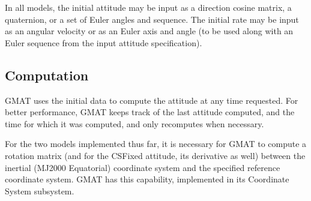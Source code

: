 In all models, the initial attitude may be input as a direction cosine matrix, a quaternion, or a set of Euler angles and sequence.  The initial rate may be input as an angular velocity or as an Euler axis and angle (to be used along with an Euler sequence from the input attitude specification).

\subsection{Computation}

GMAT uses the initial data to compute the attitude at any time requested.  For better performance, GMAT keeps track of the last attitude computed, and the time for which it was computed, and only recomputes when necessary.

For the two models implemented thus far, it is necessary for GMAT to compute a rotation matrix (and for the CSFixed attitude, its derivative as well) between the inertial (MJ2000 Equatorial) coordinate system and the specified reference coordinate system.  GMAT has this capability, implemented in its Coordinate System subsystem.

